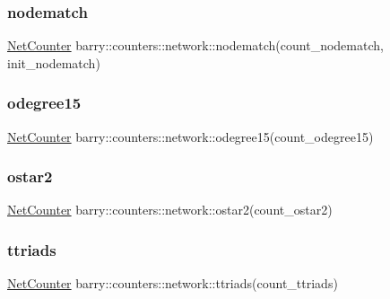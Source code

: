 \subsubsection{\texorpdfstring{nodematch}{nodematch}}
{\footnotesize\ttfamily \hyperlink{namespacebarry_1_1counters_1_1network_a2d14cbc0a77bfba218df85a750bfeb84}{Net\+Counter} barry\+::counters\+::network\+::nodematch(count\+\_\+nodematch, init\+\_\+nodematch)}

\mbox{\label{namespacebarry_1_1counters_1_1network_ac204cfc5dd18deb85d71dec056edfc16}} 
\subsubsection{\texorpdfstring{odegree15}{odegree15}}
{\footnotesize\ttfamily \hyperlink{namespacebarry_1_1counters_1_1network_a2d14cbc0a77bfba218df85a750bfeb84}{Net\+Counter} barry\+::counters\+::network\+::odegree15(count\+\_\+odegree15)}

\mbox{\label{namespacebarry_1_1counters_1_1network_abbf28b19669fd98aee3026360210e40c}} 
\subsubsection{\texorpdfstring{ostar2}{ostar2}}
{\footnotesize\ttfamily \hyperlink{namespacebarry_1_1counters_1_1network_a2d14cbc0a77bfba218df85a750bfeb84}{Net\+Counter} barry\+::counters\+::network\+::ostar2(count\+\_\+ostar2)}

\mbox{\label{namespacebarry_1_1counters_1_1network_aab259a7692f59f9276f75914f50bddca}} 
\subsubsection{\texorpdfstring{ttriads}{ttriads}}
{\footnotesize\ttfamily \hyperlink{namespacebarry_1_1counters_1_1network_a2d14cbc0a77bfba218df85a750bfeb84}{Net\+Counter} barry\+::counters\+::network\+::ttriads(count\+\_\+ttriads)}

